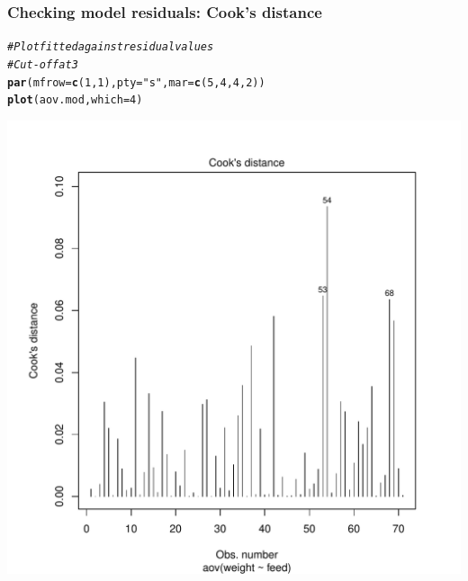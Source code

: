 \documentclass{beamer}\usepackage[]{graphicx}\usepackage[]{color}
\makeatletter
\newcommand{\hlnum}[1]{\textcolor[rgb]{0.686,0.059,0.569}{#1}}%
\newcommand{\hlstr}[1]{\textcolor[rgb]{0.192,0.494,0.8}{#1}}%
\newcommand{\hlcom}[1]{\textcolor[rgb]{0.678,0.584,0.686}{\textit{#1}}}%
\newcommand{\hlstd}[1]{\textcolor[rgb]{0.345,0.345,0.345}{#1}}%
\newcommand{\hlkwc}[1]{\textcolor[rgb]{0.333,0.667,0.333}{#1}}%
\newcommand{\hlkwd}[1]{\textcolor[rgb]{0.737,0.353,0.396}{\textbf{#1}}}%
\newenvironment{kframe}{%
 \def\at@end@of@kframe{}%
 \ifinner\ifhmode%
  \def\at@end@of@kframe{\end{minipage}}%
  \begin{minipage}{\columnwidth}%
 \fi\fi%
 \def\FrameCommand##1{\hskip\@totalleftmargin \hskip-\fboxsep
 \colorbox{shadecolor}{##1}\hskip-\fboxsep
     \hskip-\linewidth \hskip-\@totalleftmargin \hskip\columnwidth}%
 \MakeFramed {\advance\hsize-\width
   \@totalleftmargin\z@ \linewidth\hsize
   \@setminipage}}%
 {\par\unskip\endMakeFramed%
 \at@end@of@kframe}
\newenvironment{knitrout}{}{} %
\makeatother
\begin{document}
{{{
\begin{frame}[fragile]
\frametitle{Checking model residuals: Cook's distance}
\begin{knitrout}\scriptsize
{}\color{fgcolor}\begin{kframe}
\begin{alltt}
\hlcom{# Plot fitted against residual values}
\hlcom{# Cut-off at 3}
\hlkwd{par}\hlstd{(}\hlkwc{mfrow}\hlstd{=}\hlkwd{c}\hlstd{(}\hlnum{1}\hlstd{,}\hlnum{1}\hlstd{),} \hlkwc{pty}\hlstd{=}\hlstr{"s"}\hlstd{,} \hlkwc{mar} \hlstd{=} \hlkwd{c}\hlstd{(}\hlnum{5}\hlstd{,} \hlnum{4}\hlstd{,} \hlnum{4}\hlstd{,} \hlnum{2}\hlstd{))}
\hlkwd{plot}\hlstd{(aov.mod,} \hlkwc{which}\hlstd{=}\hlnum{4}\hlstd{)}
\end{alltt}
\end{kframe}

{\centering \includegraphics[width=0.6\linewidth]{figure/unnamed-chunk-48-1} 

}



\end{knitrout}
\end{frame}


}}}
\end{document}
